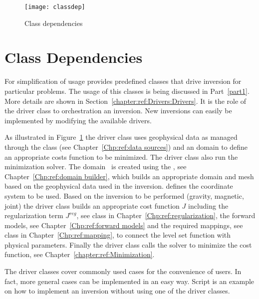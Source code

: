 \begin{figure}[ht]
    \centering\texttt{[image: classdep]}
    \caption{Class dependencies}
    \label{fig:classes}
\end{figure} 

\section{Class Dependencies}
For simplification of usage \downunder provides predefined classes that drive inversion for particular 
problems. The usage of this classes is being discussed in Part~\ref{part1}. More details are shown in
Section~\ref{chapter:ref:Drivers:Drivers}. It is the role of the driver class to orchestration an 
inversion. New inversions can easily be implemented by modifying the available drivers.

As illustrated in Figure~\ref{fig:classes} the driver class uses geophysical data as
managed through the  class (see Chapter~\ref{Chp:ref:data sources}) and 
an \escript domain to define an appropriate
costs function to be minimized. The driver class also run the minimization solver.
The \escript domain~\cite{ESCRIPT} is created using the , see Chapter~\ref{Chp:ref:domain builder},
which builds an appropriate domain and mesh based on the geophysical data used in the inversion. 
 defines the coordinate system to be used. 
Based on the inversion to be performed (gravity, magnetic, joint) the 
driver class builds an appropriate cost function $J$ including the regularization term $J^{reg}$, see
 class in Chapter~\ref{Chp:ref:regularization}, 
the forward models, see Chapter~\ref{Chp:ref:forward models} and
the required mappings, see  class in Chapter~\ref{Chp:ref:mapping},
to connect the level set function with physical parameters. Finally the driver class calls the
solver to minimize the cost function, see Chapter~\ref{chapter:ref:Minimization}.

The driver classes cover commonly used cases for the convenience of users. In fact, 
more general cases can be implemented in an easy way. Script  is an example 
on how to implement an inversion without using one of the driver classes.   















 
